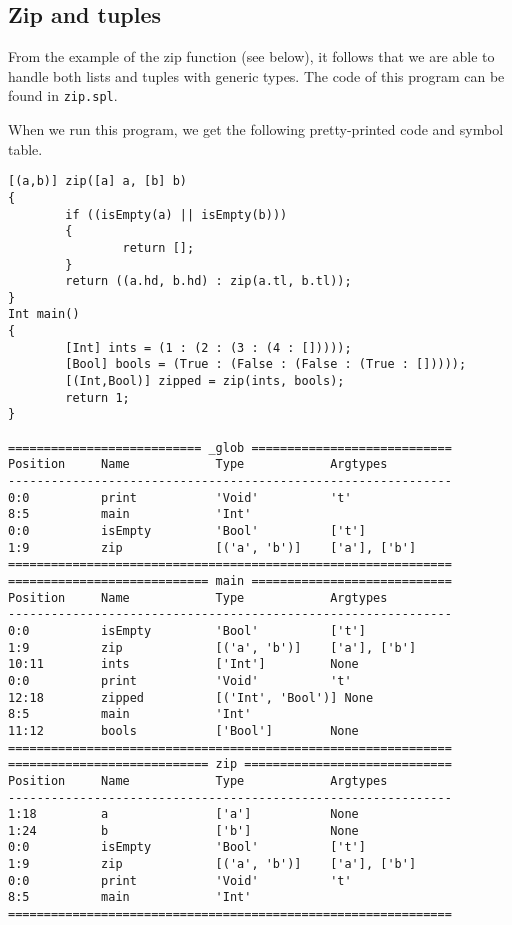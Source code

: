 \documentclass[a4paper]{article}
\begin{document}
\subsection{Zip and tuples}
From the example of the zip function (see below), it follows that we are able to handle both lists and tuples with generic types. The code of this program can be found in {\tt zip.spl}. 


When we run this program, we get the following pretty-printed code and symbol table.
\begin{verbatim}
[(a,b)] zip([a] a, [b] b)
{
        if ((isEmpty(a) || isEmpty(b)))
        {
                return [];
        }
        return ((a.hd, b.hd) : zip(a.tl, b.tl));
}
Int main()
{
        [Int] ints = (1 : (2 : (3 : (4 : []))));
        [Bool] bools = (True : (False : (False : (True : []))));
        [(Int,Bool)] zipped = zip(ints, bools);
        return 1;
}

=========================== _glob ============================
Position     Name            Type            Argtypes            
--------------------------------------------------------------
0:0          print           'Void'          't'                 
8:5          main            'Int'                               
0:0          isEmpty         'Bool'          ['t']               
1:9          zip             [('a', 'b')]    ['a'], ['b']        
==============================================================
============================ main ============================
Position     Name            Type            Argtypes            
--------------------------------------------------------------
0:0          isEmpty         'Bool'          ['t']               
1:9          zip             [('a', 'b')]    ['a'], ['b']        
10:11        ints            ['Int']         None                
0:0          print           'Void'          't'                 
12:18        zipped          [('Int', 'Bool')] None                
8:5          main            'Int'                               
11:12        bools           ['Bool']        None                
==============================================================
============================ zip =============================
Position     Name            Type            Argtypes            
--------------------------------------------------------------
1:18         a               ['a']           None                
1:24         b               ['b']           None                
0:0          isEmpty         'Bool'          ['t']               
1:9          zip             [('a', 'b')]    ['a'], ['b']        
0:0          print           'Void'          't'                 
8:5          main            'Int'                               
==============================================================
\end{verbatim}
\end{document}
